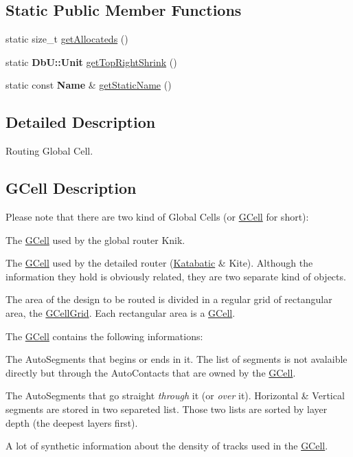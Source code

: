 \subsection*{Static Public Member Functions}
\begin{DoxyCompactItemize}
\item 
static size\-\_\-t \hyperlink{classKatabatic_1_1GCell_a91c8bc1a6bdb1b15c3c084ebfd38af47}{get\-Allocateds} ()
\item 
static {\bf Db\-U\-::\-Unit} \hyperlink{classKatabatic_1_1GCell_ac594cb2832ee7ef410c89499258d38fd}{get\-Top\-Right\-Shrink} ()
\item 
static const {\bf Name} \& \hyperlink{classKatabatic_1_1GCell_a00e56270cfb31f56e52e31afbc33ba71}{get\-Static\-Name} ()
\end{DoxyCompactItemize}


\subsection{Detailed Description}
Routing Global Cell. 

\hypertarget{classKatabatic_1_1GCell_secGCellDescription}{}\subsection{G\-Cell Description}\label{classKatabatic_1_1GCell_secGCellDescription}
Please note that there are two kind of Global Cells (or \hyperlink{classKatabatic_1_1GCell}{G\-Cell} for short)\-:
\begin{DoxyItemize}
\item The \hyperlink{classKatabatic_1_1GCell}{G\-Cell} used by the global router Knik.
\item The \hyperlink{classKatabatic_1_1GCell}{G\-Cell} used by the detailed router (\hyperlink{namespaceKatabatic}{Katabatic} \& Kite). Although the information they hold is obviously related, they are two separate kind of objects.
\end{DoxyItemize}

The area of the design to be routed is divided in a regular grid of rectangular area, the \hyperlink{classKatabatic_1_1GCellGrid}{G\-Cell\-Grid}. Each rectangular area is a \hyperlink{classKatabatic_1_1GCell}{G\-Cell}.

The \hyperlink{classKatabatic_1_1GCell}{G\-Cell} contains the following informations\-:
\begin{DoxyItemize}
\item The Auto\-Segments that begins or ends in it. The list of segments is not avalaible directly but through the Auto\-Contacts that are owned by the \hyperlink{classKatabatic_1_1GCell}{G\-Cell}.
\item The Auto\-Segments that go straight {\itshape through} it (or {\itshape over} it). Horizontal \& Vertical segments are stored in two separeted list. Those two lists are sorted by layer depth (the deepest layers first).
\item A lot of synthetic information about the density of tracks used in the \hyperlink{classKatabatic_1_1GCell}{G\-Cell}.
\end{DoxyItemize}

